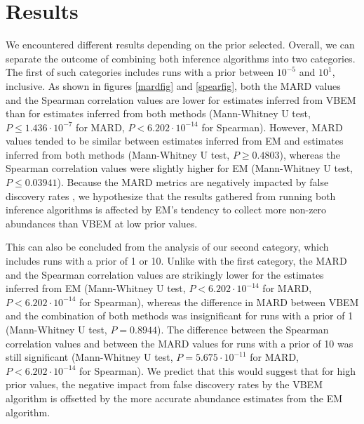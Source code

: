 \section{Results}
We encountered different results depending on the prior selected. Overall, we can separate the outcome of combining both inference algorithms into two categories. The first of such categories includes runs with a prior between $10^{-5}$ and $10^1$, inclusive. As shown in figures \ref{mardfig} and \ref{spearfig}, both the $\mathrm{MARD}$ values and the Spearman correlation values are lower for estimates inferred from VBEM than for estimates inferred from both methods (Mann-Whitney U test, $P\leq 1.436 \cdot  10^{-7}$ for MARD, $P < 6.202\cdot 10^{-14}$ for Spearman). However, MARD values tended to be similar between estimates inferred from EM and estimates inferred from both methods (Mann-Whitney U test, $P\geq 0.4803$), whereas the Spearman correlation values were slightly higher for EM (Mann-Whitney U test, $P\leq 0.03941$). Because the MARD metrics are negatively impacted by false discovery rates \cite{patro_salmon_2017}, we hypothesize that the results gathered from running both inference algorithms is affected by EM’s tendency to collect more non-zero abundances than VBEM at low prior values. 

This can also be concluded from the analysis of our second category, which includes runs with a prior of 1 or 10. Unlike with the first category, the $\mathrm{MARD}$ and the Spearman correlation values are strikingly lower for the estimates inferred from EM (Mann-Whitney U test, $P < 6.202\cdot 10^{-14}$ for $\mathrm{MARD}$, $P < 6.202\cdot 10^{-14}$ for Spearman), whereas the difference in MARD between VBEM and the combination of both methods was insignificant for runs with a prior of 1 (Mann-Whitney U test, $P = 0.8944$). The difference between the Spearman correlation values and between the MARD values for runs with a prior of 10 was still significant (Mann-Whitney U test, $P = 5.675 \cdot 10^{-11}$ for $\mathrm{MARD}$, $P < 6.202\cdot 10^{-14}$ for Spearman). We predict that this would suggest that for high prior values, the negative impact from false discovery rates by the VBEM algorithm is offsetted by the more accurate abundance estimates from the EM algorithm. 
